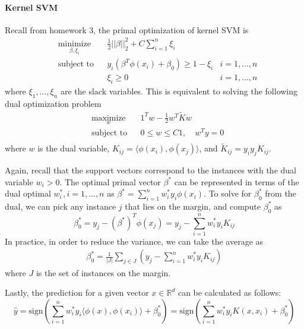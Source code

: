 \documentclass{article}
\theoremstyle{remark}
\theoremstyle{definition}
\def\R{\mathbb{R}}
\def\sign{\mathrm{sign}}
\begin{document}
\paragraph{Kernel SVM} Recall from homework 3, the primal optimization of
kernel SVM is
$$
\begin{aligned}
& \underset{\beta, \xi_i}{\text{minimize}} && \frac{1}{2}||\beta||_2^2 + C\sum_{i=1}^n\xi_i\\
& \text{subject to} && y_i(\beta^T\phi(x_i) + \beta_0) \geq 1-\xi_i & i = 1,\ldots, n\\
& && \xi_i \geq 0 & i = 1,\ldots, n
\end{aligned}
$$
where $\xi_1, \ldots, \xi_n$ are the slack variables. This is equivalent to solving the following dual optimization problem
\begin{equation}
\label{eq:dual}
\begin{aligned} 
  & \underset{w}{\text{maximize}} && 1^Tw - \frac{1}{2}w^T \tilde{K}w \\
  & \text{subject to} && 0\leq w\leq C1, \quad w^Ty = 0\\
\end{aligned}
\end{equation}
where $w$ is the dual variable, $K_{ij} = \langle\phi(x_i), \phi(x_j)\rangle$, and $\tilde{K}_{ij} = y_iy_jK_{ij}$.

Again, recall that the support vectors correspond to the instances with the dual
variable $w_i > 0$.
The optimal primal vector
$\beta^*$ can be represented in terms of the dual optimal $w^*_i, i=1,\ldots, n$ as
$\beta^* = \sum_{i=1}^n w^*_iy_i\phi(x_i)$.
To solve for $\beta^*_0$ from the
dual, we can pick any instance $j$ that lies on the margin, and compute
$\beta^*_0$ as 
$$\beta^*_0 = y_j - (\beta^*)^T\phi(x_j) = y_j - \sum_{i=1}^n w_i^* y_iK_{ij}$$
In practice, in order to reduce the variance, we can take the average as
\begin{align}
\beta^*_0 = \frac{1}{|J|}\sum_{j\in J}\left(y_j - \sum_{i=1}^n w_i^* y_iK_{ij}\right)
\label{eq:kernel_svm_intercept}
\end{align}
where $J$ is the set of instances on the margin.

Lastly, the prediction for a given vector $x\in\R^d$ can be
calculated as follows:
\begin{equation}
  \hat{y} = \sign\left(\sum_{i=1}^n w^*_i y_i \langle \phi(x), \phi(x_i)\rangle + \beta^*_0\right) = \sign\left(\sum_{i=1}^n w^*_i y_i K(x, x_i) + \beta^*_0\right)
  \label{eq:kernel_svm_prediction}
\end{equation}
\end{document}
